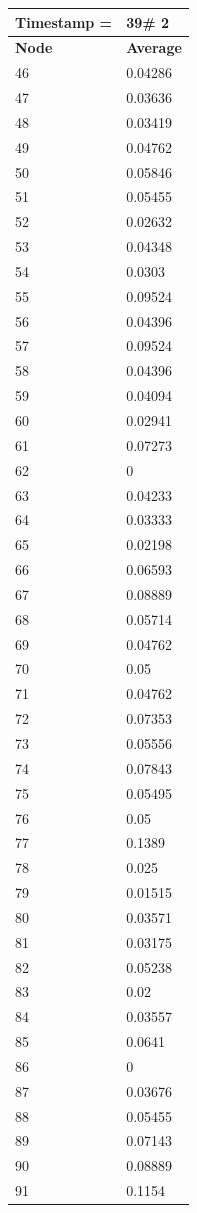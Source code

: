 \begin{tabular}{|l||l|}
\hline
\textbf{Timestamp =} & \textbf{39}\# 2\\\hline
	\textbf{Node} & \textbf{Average} \\ \hline
\hline
	46 & 0.04286 \\ \hline
	47 & 0.03636 \\ \hline
	48 & 0.03419 \\ \hline
	49 & 0.04762 \\ \hline
	50 & 0.05846 \\ \hline
	51 & 0.05455 \\ \hline
	52 & 0.02632 \\ \hline
	53 & 0.04348 \\ \hline
	54 & 0.0303 \\ \hline
	55 & 0.09524 \\ \hline
	56 & 0.04396 \\ \hline
	57 & 0.09524 \\ \hline
	58 & 0.04396 \\ \hline
	59 & 0.04094 \\ \hline
	60 & 0.02941 \\ \hline
	61 & 0.07273 \\ \hline
	62 & 0 \\ \hline
	63 & 0.04233 \\ \hline
	64 & 0.03333 \\ \hline
	65 & 0.02198 \\ \hline
	66 & 0.06593 \\ \hline
	67 & 0.08889 \\ \hline
	68 & 0.05714 \\ \hline
	69 & 0.04762 \\ \hline
	70 & 0.05 \\ \hline
	71 & 0.04762 \\ \hline
	72 & 0.07353 \\ \hline
	73 & 0.05556 \\ \hline
	74 & 0.07843 \\ \hline
	75 & 0.05495 \\ \hline
	76 & 0.05 \\ \hline
	77 & 0.1389 \\ \hline
	78 & 0.025 \\ \hline
	79 & 0.01515 \\ \hline
	80 & 0.03571 \\ \hline
	81 & 0.03175 \\ \hline
	82 & 0.05238 \\ \hline
	83 & 0.02 \\ \hline
	84 & 0.03557 \\ \hline
	85 & 0.0641 \\ \hline
	86 & 0 \\ \hline
	87 & 0.03676 \\ \hline
	88 & 0.05455 \\ \hline
	89 & 0.07143 \\ \hline
	90 & 0.08889 \\ \hline
	91 & 0.1154 \\ \hline
\end{tabular}
